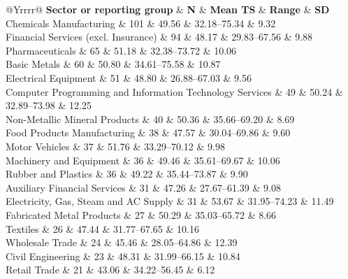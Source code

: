 \documentclass[11pt,a4paper,onecolumn]{article}
\renewcommand{\arraystretch}{1.17}
\newcommand{\checktablebox}[2]{%
\begin{lrbox}{#1}\begin{minipage}{\textwidth}\captionsetup{type=table}#2\end{minipage}\end{lrbox}%
\ifdim\dimexpr\ht#1+\dp#1\relax>\textheight
\PackageError{GRASP-layout}{A compact table exceeds one page}{Reduce table height before publication.}%
\fi
\ifdim\wd#1>\textwidth
\PackageError{GRASP-layout}{A compact table exceeds the text width}{Reduce table width before publication.}%
\fi
\noindent\usebox{#1}\clearpage}
\begin{document}
\checktablebox{\sectorcheck}{
\centering
\begingroup
\footnotesize
\setlength{\tabcolsep}{5pt}
\renewcommand{\arraystretch}{1.00}
\caption{Sector summary on one page. All 47 sectors containing at least five companies are listed individually; 25 smaller sectors are pooled below the rule. Counts cover all 1,164 companies. SD describes company-score spread, not uncertainty in the mean. The five-company threshold controls presentation rather than statistical reliability. Supplementary Table S2 retains all 72 sectors and medians.}
\label{tab:all_sectors}
\begin{tabularx}{\linewidth}{@{}Yrrrr@{}}
\toprule\textbf{Sector or reporting group} & \textbf{N} & \textbf{Mean TS} & \textbf{Range} & \textbf{SD}\\\midrule
Chemicals Manufacturing & 101 & 49.56 & 32.18--75.34 & 9.32 \\
Financial Services (excl. Insurance) & 94 & 48.17 & 29.83--67.56 & 9.88 \\
Pharmaceuticals & 65 & 51.18 & 32.38--73.72 & 10.06 \\
Basic Metals & 60 & 50.80 & 34.61--75.58 & 10.87 \\
Electrical Equipment & 51 & 48.80 & 26.88--67.03 & 9.56 \\
Computer Programming and Information Technology Services & 49 & 50.24 & 32.89--73.98 & 12.25 \\
Non-Metallic Mineral Products & 40 & 50.36 & 35.66--69.20 & 8.69 \\
Food Products Manufacturing & 38 & 47.57 & 30.04--69.86 & 9.60 \\
Motor Vehicles & 37 & 51.76 & 33.29--70.12 & 9.98 \\
Machinery and Equipment & 36 & 49.46 & 35.61--69.67 & 10.06 \\
Rubber and Plastics & 36 & 49.22 & 35.44--73.87 & 9.90 \\
Auxiliary Financial Services & 31 & 47.26 & 27.67--61.39 & 9.08 \\
Electricity, Gas, Steam and AC Supply & 31 & 53.67 & 31.95--74.23 & 11.49 \\
Fabricated Metal Products & 27 & 50.29 & 35.03--65.72 & 8.66 \\
Textiles & 26 & 47.44 & 31.77--67.65 & 10.16 \\
Wholesale Trade & 24 & 45.46 & 28.05--64.86 & 12.39 \\
Civil Engineering & 23 & 48.31 & 31.99--66.15 & 10.84 \\
Retail Trade & 21 & 43.06 & 34.22--56.45 & 6.12 \\

\end{tabularx}}
\end{document}
